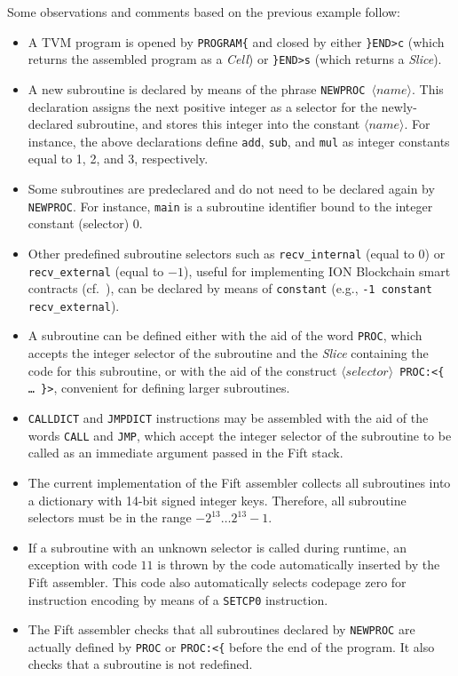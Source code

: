 \documentclass[12pt,oneside]{article}
\begin{document}
Some observations and comments based on the previous example follow:
\begin{itemize}
\item A TVM program is opened by {\tt PROGRAM\{} and closed by either {\tt \}END>c} (which returns the assembled program as a {\em Cell\/}) or {\tt \}END>s} (which returns a {\em Slice\/}).
\item A new subroutine is declared by means of the phrase {\tt NEWPROC $\langle\textit{name}\rangle$}. This declaration assigns the next positive integer as a selector for the newly-declared subroutine, and stores this integer into the constant $\langle\textit{name}\rangle$. For instance, the above declarations define {\tt add}, {\tt sub}, and {\tt mul} as integer constants equal to 1, 2, and 3, respectively.
\item Some subroutines are predeclared and do not need to be declared again by {\tt NEWPROC}. For instance, {\tt main} is a subroutine identifier bound to the integer constant (selector) 0.
\item Other predefined subroutine selectors such as {\tt recv\_internal} (equal to $0$) or {\tt recv\_external} (equal to $-1$), useful for implementing ION Blockchain smart contracts (cf.~\cite[4.4]{TBC}), can be declared by means of {\tt constant} (e.g., {\tt -1 constant recv\_external}).
\item A subroutine can be defined either with the aid of the word {\tt PROC}, which accepts the integer selector of the subroutine and the {\em Slice} containing the code for this subroutine, or with the aid of the construct {\tt $\langle\textit{selector}\rangle$ PROC:<\{ \dots\ \}>}, convenient for defining larger subroutines.
\item {\tt CALLDICT} and {\tt JMPDICT} instructions may be assembled with the aid of the words {\tt CALL} and {\tt JMP}, which accept the integer selector of the subroutine to be called as an immediate argument passed in the Fift stack.
\item The current implementation of the Fift assembler collects all subroutines into a dictionary with 14-bit signed integer keys. Therefore, all subroutine selectors must be in the range $-2^{13}\dots 2^{13}-1$.
\item If a subroutine with an unknown selector is called during runtime, an exception with code $11$ is thrown by the code automatically inserted by the Fift assembler. This code also automatically selects codepage zero for instruction encoding by means of a {\tt SETCP0} instruction.
\item The Fift assembler checks that all subroutines declared by {\tt NEWPROC} are actually defined by {\tt PROC} or {\tt PROC:<\{} before the end of the program. It also checks that a subroutine is not redefined.
\end{itemize}
\end{document}
